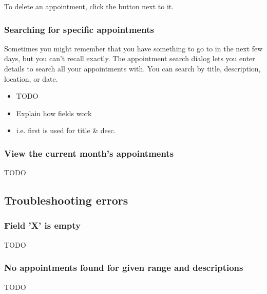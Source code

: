 
To delete an appointment, click the  button next to it.



\subsubsection{Searching for specific appointments}


Sometimes you might remember that you have something to go to in the next few
days, but you can't recall exactly. The appointment search dialog lets you enter
details to search all your appointments with. You can search by title,
description, location, or date.

\begin{itemize}
    \item TODO
    \item Explain how fields work
    \item i.e. first is used for title \& desc.
\end{itemize}


\subsubsection{View the current month's appointments}

TODO


\subsection{Troubleshooting errors}
\subsubsection{Field 'X' is empty}


TODO


\subsubsection{No appointments found for given range and descriptions}


TODO
